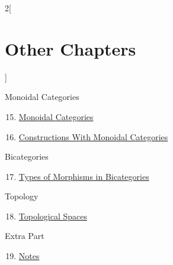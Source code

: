 \begin{multicols}{2}[\section{Other Chapters}]
\begin{enumerate}
\end{enumerate}
Monoidal Categories
\begin{enumerate}
\setcounter{enumi}{14}
\item \hyperref[monoidal-categories:section-phantom]{Monoidal Categories}
\item \hyperref[constructions-with-monoidal-categories:section-phantom]{Constructions With Monoidal Categories}
\end{enumerate}
Bicategories
\begin{enumerate}
\setcounter{enumi}{16}
\item \hyperref[types-of-morphisms-in-bicategories:section-phantom]{Types of Morphisms in Bicategories}
\end{enumerate}
Topology
\begin{enumerate}
\setcounter{enumi}{17}
\item \hyperref[topological-spaces:section-phantom]{Topological Spaces}
\end{enumerate}
Extra Part
\begin{enumerate}
\setcounter{enumi}{18}
\item \hyperref[notes:section-phantom]{Notes}
\end{enumerate}
\end{multicols}
